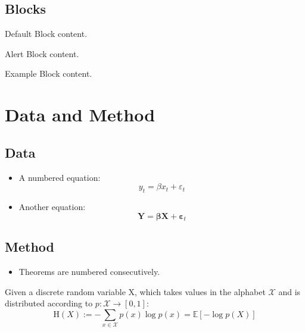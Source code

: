 \documentclass[
11pt,notheorems,hyperref={pdfauthor=whatever}
]{beamer}
\begin{document}
\subsection{Blocks}
\begin{frame}

   \centering
	\begin{minipage}[b]{0.5\textwidth}

	  \begin{block}{Default}
        Block content.
      \end{block}

      \begin{alertblock}{Alert}
        Block content.
      \end{alertblock}

      \begin{exampleblock}{Example}
        Block content.
      \end{exampleblock}      
      
	\end{minipage}	
\end{frame}

\section{Data and Method}
\subsection{Data}
\begin{frame}
    \begin{itemize}
        \item A numbered equation:
        \begin{equation}
            y_t = \beta x_t + \varepsilon_t
        \end{equation}
         \item Another equation:
        \begin{equation*}
            \mathbf{Y} = \boldsymbol{\beta} \mathbf{X} + \boldsymbol{\varepsilon}_t
        \end{equation*}
    \end{itemize}
\end{frame}

\subsection{Method}
\begin{frame}
    \begin{itemize}
        \item Theorems are numbered consecutively.
    \end{itemize}
    \begin{theorem}
         Given a discrete random variable X, which takes values in the alphabet $\mathcal{X}$ and is distributed according to  $p:{\mathcal {X}}\to [0,1]$:
            \begin{equation}
                \mathrm {H} (X):=-\sum _{x\in {\mathcal {X}}}p(x)\log p(x)=\mathbb {E} [-\log p(X)]
            \end{equation}
    \end{theorem}
\end{frame}
\end{document}

